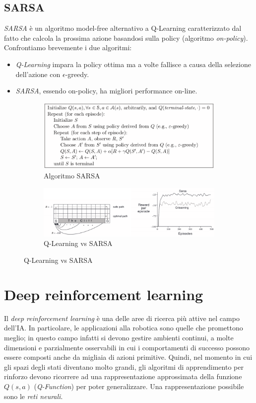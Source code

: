 \documentclass[11pt,oneside]{book}
\begin{document}
\subsection{SARSA}
\textit{SARSA} è un algoritmo model-free alternativo a Q-Learning caratterizzato dal fatto che calcola la prossima azione basandosi sulla policy (algoritmo \textit{on-policy}). Confrontiamo brevemente i due algoritmi:
\begin{itemize}
    \item \textit{Q-Learning} impara la policy ottima ma a volte fallisce a causa della selezione dell'azione con $\epsilon$-greedy.
    \item \textit{SARSA}, essendo on-policy, ha migliori performance on-line.
\end{itemize}
\begin{figure}[htp]
	\begin{subfigure}{0.49\textwidth}
	    \centering
		\includegraphics[width=\textwidth, height=\textheight, keepaspectratio]{sarsa1.png}
		\caption{Algoritmo SARSA}
	\end{subfigure}
	\hfill
	\begin{subfigure}{0.49\textwidth}
	    \centering
		\includegraphics[width=\textwidth, height=\textheight, keepaspectratio]{sarsa2.png}
		\caption{Q-Learning vs SARSA}
	\end{subfigure}
\end{figure}


\section{Deep reinforcement learning}
Il \textit{deep reinforcement learning} è una delle aree di ricerca più attive nel campo dell'IA. In particolare, le applicazioni alla robotica sono quelle che promettono meglio; in questo campo infatti si devono gestire ambienti continui, a molte dimensioni e parzialmente osservabili in cui i comportamenti di successo possono essere composti anche da migliaia di azioni primitive. Quindi, nel momento in cui gli spazi degli stati diventano molto grandi, gli algoritmi di apprendimento per rinforzo devono ricorrere ad una rappresentazione approssimata della funzione $Q(s,a)$ (\textit{Q-Function}) per poter generalizzare. Una rappresentazione possibile sono le \textit{reti neurali}.
\end{document}
